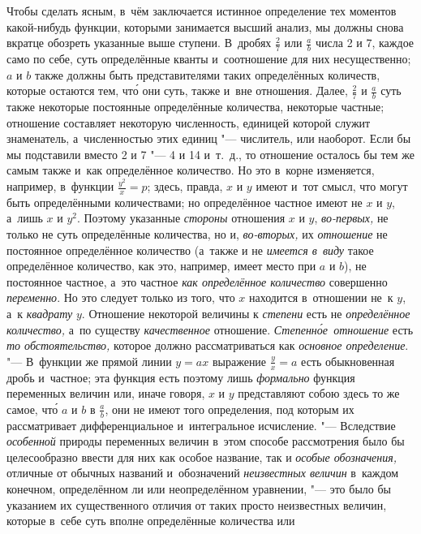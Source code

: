 Чтобы сделать ясным, в~чём заключается истинное определение тех моментов
какой-нибудь функции, которыми занимается высший анализ, мы должны снова
вкратце обозреть указанные выше ступени. В~дробях $\frac 2 7$ или $\frac a b$
числа 2 и 7, каждое само по себе, суть определённые кванты и~соотношение
для них несущественно; $a$ и $b$ также должны быть представителями таких
определённых количеств, которые остаются тем, чт\'{о} они суть, также и~вне
отношения. Далее, $\frac 2 7$ и $\frac a b$ суть также некоторые постоянные
определённые количества, некоторые частные; отношение составляет некоторую
численность, единицей которой служит знаменатель, а~численностью этих единиц
"--- числитель, или наоборот. Если бы мы подставили вместо 2 и 7 "--- 4 и 14
и~т.~д., то отношение осталось бы тем же самым также и~как определённое
количество. Но это в~корне изменяется, например, в~функции
$\frac{y^2}x=p$; здесь, правда, $x$ и $y$ имеют и~тот смысл, что могут
быть определёнными количествами; но
определённое частное имеют не $x$ и $y$, а~лишь $x$ и $y^2$. Поэтому
указанные {\em стороны} отношения $x$ и $y$,
{\em во-первых,} не только не суть
определённые количества, но и, {\em во-вторых,} их
{\em отношение} не постоянное определённое количество (а~также и
не {\em имеется в~виду} такое определённое количество, как это, например,
имеет место при $a$ и $b$),
не постоянное частное, а~это частное {\em как определённое количество}
совершенно {\em переменно}. Но это следует только из того, что $x$ находится
в~отношении не~к $y$, а~к {\em квадрату} $y$. Отношение некоторой величины
к {\em степени} есть не {\em определённое количество,} а~по существу
{\em качественное} отношение. {\em Степенн\'{о}е~отношение} есть
{\em то обстоятельство,} которое должно рассматриваться как
{\em основное определение}. "--- В~функции же прямой линии $y=ax$ выражение
$\frac y x=a$ есть обыкновенная
дробь и~частное; эта функция есть поэтому лишь {\em формально} функция
переменных величин или, иначе говоря, $x$ и $y$ представляют собою здесь то же
самое, чт\'{о} $a$ и $b$ в $\frac a b$, они не имеют того определения, под которым
их рассматривает дифференциальное и~интегральное исчисление. "--- Вследствие
{\em особенной} природы переменных величин в~этом способе рассмотрения было бы
целесообразно ввести для них как особое название, так и
{\em особые обозначения,} отличные от обычных названий и~обозначений
{\em неизвестных величин} в~каждом конечном, определённом ли или неопределённом
уравнении, "--- это было бы указанием их существенного отличия от таких просто
неизвестных величин, которые в~себе суть вполне определённые количества или
